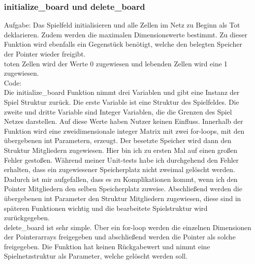 \documentclass[11pt]{scrartcl}
\begin{document}
\subsubsection{initialize\_board und delete\_board}
Aufgabe: Das Spielfeld initialisieren und alle Zellen im Netz zu Beginn als Tot deklarieren. Zudem werden die maximalen Dimensionswerte bestimmt.
Zu dieser Funktion wird ebenfalls ein Gegenstück benötigt, welche den belegten Speicher der Pointer wieder freigibt.\\
toten Zellen wird der Werte 0 zugewiesen und lebenden Zellen wird eine 1 zugewiesen.\\
Code:\\
Die initialize\_board Funktion nimmt drei Variablen und gibt eine Instanz der Spiel Struktur zurück. Die erste Variable ist eine Struktur des Spielfeldes. Die zweite und dritte Variable sind Integer Variablen, 
die die Grenzen des Spiel Netzes darstellen. Auf diese Werte haben Nutzer keinen Einfluss. Innerhalb der Funktion wird eine zweidimensionale integer Matrix mit zwei for-loops, mit den übergebenen int Parametern, erzeugt.
Der besetzte Speicher wird dann den Struktur Mitgliedern zugewiesen. Hier bin ich zu ersten Mal auf einen gro\ss en Fehler gesto\ss en. Während meiner Unit-tests habe ich durchgehend den Fehler erhalten, dass ein zugewiesener Speicherplatz nicht zweimal gelöscht werden. Dadurch ist mir aufgefallen, dass es zu Komplikationen kommt, wenn ich den Pointer Mitgliedern den selben Speicherplatz zuweise. 
Abschlie\ss end werden die übergebenen int Parameter den Struktur Mitgliedern zugewiesen, diese sind in späteren Funktionen wichtig und die bearbeitete Spielstruktur wird zurückgegeben.\\
delete\_board ist sehr simple. Über ein for-loop werden die einzelnen Dimensionen der Pointerarrays freigegeben und abschlie\ss end werden die Pointer als solche freigegeben. Die Funktion hat keinen Rückgabewert und nimmt eine Spielnetzstruktur als Parameter, welche gelöscht werden soll.      
\end{document}

